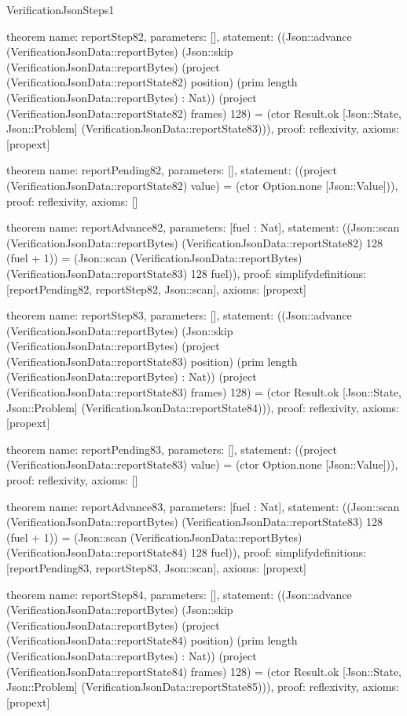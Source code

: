 \begin{lexlean}{VerificationJsonSteps1}
\begin{semanticmodule}
theorem{
  name: reportStep82,
  parameters: [],
  statement: ((Json::advance (VerificationJsonData::reportBytes) (Json::skip (VerificationJsonData::reportBytes) (project (VerificationJsonData::reportState82) position) (prim length (VerificationJsonData::reportBytes) : Nat)) (project (VerificationJsonData::reportState82) frames) 128) = (ctor Result.ok [Json::State, Json::Problem] (VerificationJsonData::reportState83))),
  proof: reflexivity{},
  axioms: [propext]
}

theorem{
  name: reportPending82,
  parameters: [],
  statement: ((project (VerificationJsonData::reportState82) value) = (ctor Option.none [Json::Value])),
  proof: reflexivity{},
  axioms: []
}

theorem{
  name: reportAdvance82,
  parameters: [fuel : Nat],
  statement: ((Json::scan (VerificationJsonData::reportBytes) (VerificationJsonData::reportState82) 128 (fuel + 1)) = (Json::scan (VerificationJsonData::reportBytes) (VerificationJsonData::reportState83) 128 fuel)),
  proof: simplify{definitions: [reportPending82, reportStep82, Json::scan]},
  axioms: [propext]
}

theorem{
  name: reportStep83,
  parameters: [],
  statement: ((Json::advance (VerificationJsonData::reportBytes) (Json::skip (VerificationJsonData::reportBytes) (project (VerificationJsonData::reportState83) position) (prim length (VerificationJsonData::reportBytes) : Nat)) (project (VerificationJsonData::reportState83) frames) 128) = (ctor Result.ok [Json::State, Json::Problem] (VerificationJsonData::reportState84))),
  proof: reflexivity{},
  axioms: [propext]
}

theorem{
  name: reportPending83,
  parameters: [],
  statement: ((project (VerificationJsonData::reportState83) value) = (ctor Option.none [Json::Value])),
  proof: reflexivity{},
  axioms: []
}

theorem{
  name: reportAdvance83,
  parameters: [fuel : Nat],
  statement: ((Json::scan (VerificationJsonData::reportBytes) (VerificationJsonData::reportState83) 128 (fuel + 1)) = (Json::scan (VerificationJsonData::reportBytes) (VerificationJsonData::reportState84) 128 fuel)),
  proof: simplify{definitions: [reportPending83, reportStep83, Json::scan]},
  axioms: [propext]
}

theorem{
  name: reportStep84,
  parameters: [],
  statement: ((Json::advance (VerificationJsonData::reportBytes) (Json::skip (VerificationJsonData::reportBytes) (project (VerificationJsonData::reportState84) position) (prim length (VerificationJsonData::reportBytes) : Nat)) (project (VerificationJsonData::reportState84) frames) 128) = (ctor Result.ok [Json::State, Json::Problem] (VerificationJsonData::reportState85))),
  proof: reflexivity{},
  axioms: [propext]
}


\end{semanticmodule}
\end{lexlean}
